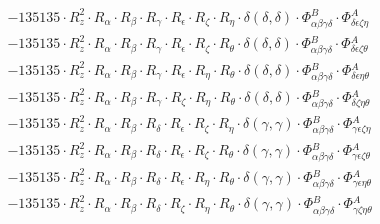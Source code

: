 \documentclass{article}
\begin{document}
\begin{subequations}
\begin{gather}
\begin{array}{c}
 \\[0.2em] 		 - 135135 \cdot R_{z}^{2} \cdot R_{\alpha{}} \cdot R_{\beta{}} \cdot R_{\gamma{}} \cdot R_{\epsilon{}} \cdot R_{\zeta{}} \cdot R_{\eta{}} \cdot \delta{}\left(\delta{}, \delta{}\right) \cdot \Phi{}^{B}_{\alpha{}\beta{}\gamma{}\delta{}} \cdot \Phi{}^{A}_{\delta{}\epsilon{}\zeta{}\eta{}} 
 \\[0.2em] 		 - 135135 \cdot R_{z}^{2} \cdot R_{\alpha{}} \cdot R_{\beta{}} \cdot R_{\gamma{}} \cdot R_{\epsilon{}} \cdot R_{\zeta{}} \cdot R_{\theta{}} \cdot \delta{}\left(\delta{}, \delta{}\right) \cdot \Phi{}^{B}_{\alpha{}\beta{}\gamma{}\delta{}} \cdot \Phi{}^{A}_{\delta{}\epsilon{}\zeta{}\theta{}} 
 \\[0.2em] 		 - 135135 \cdot R_{z}^{2} \cdot R_{\alpha{}} \cdot R_{\beta{}} \cdot R_{\gamma{}} \cdot R_{\epsilon{}} \cdot R_{\eta{}} \cdot R_{\theta{}} \cdot \delta{}\left(\delta{}, \delta{}\right) \cdot \Phi{}^{B}_{\alpha{}\beta{}\gamma{}\delta{}} \cdot \Phi{}^{A}_{\delta{}\epsilon{}\eta{}\theta{}} 
 \\[0.2em] 		 - 135135 \cdot R_{z}^{2} \cdot R_{\alpha{}} \cdot R_{\beta{}} \cdot R_{\gamma{}} \cdot R_{\zeta{}} \cdot R_{\eta{}} \cdot R_{\theta{}} \cdot \delta{}\left(\delta{}, \delta{}\right) \cdot \Phi{}^{B}_{\alpha{}\beta{}\gamma{}\delta{}} \cdot \Phi{}^{A}_{\delta{}\zeta{}\eta{}\theta{}} 
 \\[0.2em] 		 - 135135 \cdot R_{z}^{2} \cdot R_{\alpha{}} \cdot R_{\beta{}} \cdot R_{\delta{}} \cdot R_{\epsilon{}} \cdot R_{\zeta{}} \cdot R_{\eta{}} \cdot \delta{}\left(\gamma{}, \gamma{}\right) \cdot \Phi{}^{B}_{\alpha{}\beta{}\gamma{}\delta{}} \cdot \Phi{}^{A}_{\gamma{}\epsilon{}\zeta{}\eta{}} 
 \\[0.2em] 		 - 135135 \cdot R_{z}^{2} \cdot R_{\alpha{}} \cdot R_{\beta{}} \cdot R_{\delta{}} \cdot R_{\epsilon{}} \cdot R_{\zeta{}} \cdot R_{\theta{}} \cdot \delta{}\left(\gamma{}, \gamma{}\right) \cdot \Phi{}^{B}_{\alpha{}\beta{}\gamma{}\delta{}} \cdot \Phi{}^{A}_{\gamma{}\epsilon{}\zeta{}\theta{}} 
 \\[0.2em] 		 - 135135 \cdot R_{z}^{2} \cdot R_{\alpha{}} \cdot R_{\beta{}} \cdot R_{\delta{}} \cdot R_{\epsilon{}} \cdot R_{\eta{}} \cdot R_{\theta{}} \cdot \delta{}\left(\gamma{}, \gamma{}\right) \cdot \Phi{}^{B}_{\alpha{}\beta{}\gamma{}\delta{}} \cdot \Phi{}^{A}_{\gamma{}\epsilon{}\eta{}\theta{}} 
 \\[0.2em] 		 - 135135 \cdot R_{z}^{2} \cdot R_{\alpha{}} \cdot R_{\beta{}} \cdot R_{\delta{}} \cdot R_{\zeta{}} \cdot R_{\eta{}} \cdot R_{\theta{}} \cdot \delta{}\left(\gamma{}, \gamma{}\right) \cdot \Phi{}^{B}_{\alpha{}\beta{}\gamma{}\delta{}} \cdot \Phi{}^{A}_{\gamma{}\zeta{}\eta{}\theta{}} 

\end{array}
\end{gather}
\end{subequations}
\end{document}

